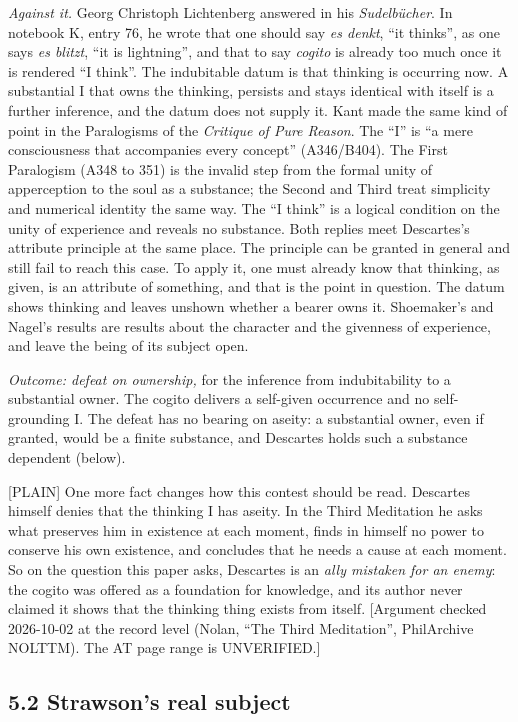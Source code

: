 \documentclass[11pt]{article}
\newcommand{\register}[1]{{\ttfamily\small #1}}
\begin{document}
\emph{Against it.} Georg Christoph Lichtenberg answered in his \emph{Sudelbücher}. In notebook K, entry 76, he wrote that one should say \emph{es denkt}, ``it thinks'', as one says \emph{es blitzt}, ``it is lightning'', and that to say \emph{cogito} is already too much once it is rendered ``I think''. The indubitable datum is that thinking is occurring now. A substantial I that owns the thinking, persists and stays identical with itself is a further inference, and the datum does not supply it. Kant made the same kind of point in the Paralogisms of the \emph{Critique of Pure Reason}. The ``I'' is ``a mere consciousness that accompanies every concept'' (A346/\allowbreak{}B404). The First Paralogism (A348 to 351) is the invalid step from the formal unity of apperception to the soul as a substance; the Second and Third treat simplicity and numerical identity the same way. The ``I think'' is a logical condition on the unity of experience and reveals no substance. Both replies meet Descartes's attribute principle at the same place. The principle can be granted in general and still fail to reach this case. To apply it, one must already know that thinking, as given, is an attribute of something, and that is the point in question. The datum shows thinking and leaves unshown whether a bearer owns it. Shoemaker's and Nagel's results are results about the character and the givenness of experience, and leave the being of its subject open.

\emph{Outcome: defeat on ownership,} for the inference from indubitability to a substantial owner. The cogito delivers a self-given occurrence and no self-grounding I. The defeat has no bearing on aseity: a substantial owner, even if granted, would be a finite substance, and Descartes holds such a substance dependent (below).

\register{[PLAIN]} One more fact changes how this contest should be read. Descartes himself denies that the thinking I has aseity. In the Third Meditation he asks what preserves him in existence at each moment, finds in himself no power to conserve his own existence, and concludes that he needs a cause at each moment. So on the question this paper asks, Descartes is an \emph{ally mistaken for an enemy}: the cogito was offered as a foundation for knowledge, and its author never claimed it shows that the thinking thing exists from itself. [Argument checked 2026-10-02 at the record level (Nolan, ``The Third Meditation'', PhilArchive NOLTTM). The AT page range is UNVERIFIED.]

\subsection*{5.2 Strawson's real subject}
\end{document}

